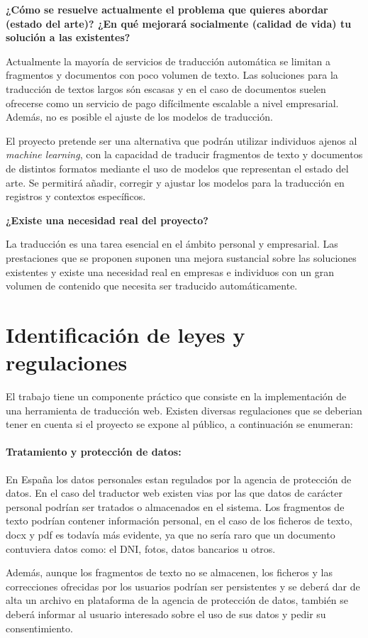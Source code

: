 \textbf{¿Cómo se resuelve actualmente el problema que quieres abordar (estado del arte)?
¿En qué mejorará socialmente (calidad de vida) tu solución a las existentes?}

Actualmente la mayoría de servicios de traducción automática se limitan a fragmentos y documentos
con poco volumen de texto. Las soluciones para la traducción de textos largos
són escasas y en el caso de documentos suelen ofrecerse
como un servicio de pago difícilmente escalable a nivel empresarial. Además, no es posible
el ajuste de los modelos de traducción.

El proyecto pretende ser una alternativa que podrán utilizar individuos ajenos al \textit{machine learning},
con la capacidad de traducir fragmentos de texto y documentos de distintos formatos mediante
el uso de modelos que representan el estado del arte.
Se permitirá añadir, corregir y ajustar los modelos para la traducción en registros y contextos
específicos.

\textbf{¿Existe una necesidad real del proyecto?}

La traducción es una tarea esencial en el ámbito personal y empresarial. Las prestaciones que se proponen
suponen una mejora sustancial sobre las soluciones existentes y existe una necesidad real en empresas
e individuos con un gran volumen de contenido que necesita ser traducido automáticamente.


\section{Identificación de leyes y regulaciones}
El trabajo tiene un componente práctico que consiste en la implementación de una herramienta de traducción web.
Existen diversas regulaciones que se deberian tener en cuenta si el proyecto se expone al público, a continuación se enumeran:
\paragraph{Tratamiento y protección de datos:}
En España los datos personales estan regulados por la agencia de protección de datos. En el caso del traductor web existen vias por las que datos de carácter personal podrían ser tratados o almacenados en el sistema. Los fragmentos de texto podrían contener información personal, en el caso de los ficheros de texto, docx y pdf es todavía más evidente, ya que no sería raro que un documento contuviera datos como: el DNI, fotos, datos bancarios u otros.

Además, aunque los fragmentos de texto no se almacenen, los ficheros y las correcciones ofrecidas por los usuarios podrían ser persistentes y se deberá dar de alta un archivo en plataforma de la agencia de protección de datos, también se deberá informar al usuario interesado sobre el uso de sus datos y pedir su consentimiento.

